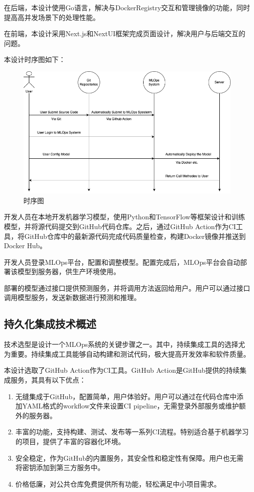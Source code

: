 \documentclass{HDU-Bachelor-Thesis}
\begin{document}
在后端，本设计使用Go语言，解决与DockerRegistry交互和管理镜像的功能，同时提高高并发场景下的处理性能。

在前端，本设计采用Next.js和NextUI框架完成页面设计，解决用户与后端交互的问题。

本设计时序图如下：

\begin{figure}[H] %
\centering %
\includegraphics[width=1\textwidth]{P-1.png} %
\caption{时序图} %
\label{图片.2-1} %
\end{figure}

开发人员在本地开发机器学习模型，使用Python和TensorFlow等框架设计和训练模型，并将源代码提交到GitHub代码仓库。之后，通过GitHub Action作为CI工具，将GitHub仓库中的最新源代码完成代码质量检查，构建Docker镜像并推送到Docker Hub。

开发人员登录MLOps平台，配置和调整模型。配置完成后，MLOps平台会自动部署该模型到服务器，供生产环境使用。

部署的模型通过接口提供预测服务，并将调用方法返回给用户。用户可以通过接口调用模型服务，发送新数据进行预测和推理。

\subsection{持久化集成技术概述}

技术选型是设计一个MLOps系统的关键步骤之一。其中，持续集成工具的选择尤为重要。持续集成工具能够自动构建和测试代码，极大提高开发效率和软件质量。

本设计选取了GitHub Action作为CI工具。GitHub Action是GitHub提供的持续集成服务，其具有以下优点：

\begin{enumerate}
    \item 无缝集成于GitHub，配置简单，用户体验好。用户可以通过在代码仓库中添加YAML格式的workflow文件来设置CI pipeline，无需登录外部服务或维护额外的服务器。
    \item 丰富的功能，支持构建、测试、发布等一系列CI流程。特别适合基于机器学习的项目，提供了丰富的容器化环境。
    \item 安全稳定，作为GitHub的内置服务，其安全性和稳定性有保障。用户也无需将密钥添加到第三方服务中。
    \item 价格低廉，对公共仓库免费提供所有功能，轻松满足中小项目需求。
\end{enumerate}
\end{document}
